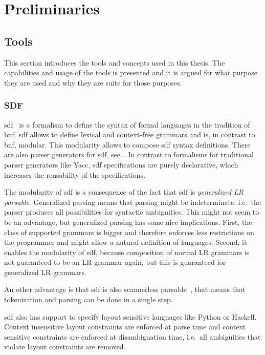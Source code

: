 
\chapter{Preliminaries}
\section{Tools}
This section introduces the tools and concepts used in this
thesis. The capabilities and usage of the tools is presented and it is
argued for what purpose they are used and why they are suite for those
purposes.
\subsection{SDF}
\gls{sdf}~\cite{Heering:1989:SDF:71605.71607} is a formalism to define
the syntax of formal languages in the tradition of
\gls{bnf}. \gls{sdf} allows to define lexical and context-free
grammars and is, in contrast to \gls{bnf}, modular. This modularity
allows to compose \gls{sdf} syntax definitions. There are also parser
generators for \gls{sdf}, see~\cite{Rekers92parsergeneration}. In
contrast to formalisms for traditional parser generators like
Yacc\cite{Johnson75yacc:yet}, \gls{sdf} specifications are purely
declarative, which increases the reusability of the specifications.

The modularity of \gls{sdf} is a consequence of the fact that
\gls{sdf} is \textit{generalized LR
  parsable}\cite{Rekers92parsergeneration}. Generalized parsing means
that parsing might be indeterminate, i.e.\ the parser produces all
possibilities for syntactic ambiguities. This might not seem to be an
advantage, but generalized parsing has some nice implications. First,
the class of supported grammars is bigger and therefore enforces less
restrictions on the programmer and might allow a natural definition of
languages. Second, it enables the modularity of \gls{sdf}, because
composition of normal LR grammars is not guaranteed to be an LR
grammar again, but this is guaranteed for generalized LR grammars.

An other advantage is that \gls{sdf} is also scannerless
parsable~\cite{Brand02disambiguationfilters}, that means that
tokenization and parsing can be done in a single step.

\gls{sdf} also has support to specify layout sensitive
languages\cite{conf/sle/ErdwegRKO12} like Python or Haskell. Context
insensitive layout constraints are enforced at parse time and context
sensitive constraints are enforced at disambiguation time, i.e.\ all
ambiguities that violate layout constraints are removed.

